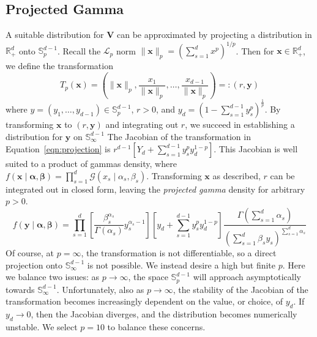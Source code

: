 \subsection{Projected Gamma\label{ref:pg}}
A suitable distribution for $\bm{V}$ can be approximated by projecting a 
    distribution in $\mathbb{R}_+^d$ onto $\mathbb{S}_{p}^{d-1}$.  
    Recall the $\mathcal{L}_p$ norm 
    $\lVert \bm{x}\rVert_p = \left(\sum_{s = 1}^dx^p\right)^{1/p}$.  Then
    for $\bm{x}\in\mathbb{R}_+^d$, we define the transformation
    \begin{equation}
        \label{eqn:projection}
        T_p(\bm{x}) = \left(\lVert \bm{x}\rVert_p, 
            \frac{x_1}{\lVert \bm{x}\rVert_p},\ldots, 
                \frac{x_{d-1}}{\lVert \bm{x}\rVert_p}\right)
                =: (r,\bm{y})
    \end{equation}
    where $y = (y_1,\ldots,y_{d-1}) \in \mathbb{S}_{p}^{d-1}$, $r > 0$, and 
    $y_d = (1 - \sum_{s = 1}^{d-1}y_{s}^p)^{\frac{1}{p}}$.
    By transforming $\bm{x}$ to $(r,\bm{y})$ and integrating out $r$, we
    succeed in establishing a distribution for $\bm{y}$ on 
    $\mathbb{S}_{\infty}^{d-1}$
    The Jacobian of the transformation in Equation~\eqref{eqn:projection} is
    $r^{d-1}[Y_d + \sum_{s = 1}^{d-1}y_{s}^py_d^{1-p}]$.
    This Jacobian is well suited to a product of gammas density, where 
    $f(\bm{x}\mid\bm{\alpha},\bm{\beta}) = 
        \prod_{s = 1}^d\mathcal{G}(x_{s}\mid\alpha_{s},\beta_{s})$.
    Transforming $\bm{x}$ as described, $r$ can be integrated out in closed
    form, leaving the \emph{projected gamma} density for arbitrary $p > 0$.
    \[
        f(\bm{y}\mid\bm{\alpha},\bm{\beta}) = \prod_{s = 1}^d\left[
            \frac{\beta_{s}^{\alpha_{s}}}{\Gamma(\alpha_{s})}
            y_{s}^{\alpha_{s} - 1}\right]
            \left[y_d + \sum_{s = 1}^{d-1}y_{s}^py_d^{1-p}\right]
            \frac{\Gamma(\sum_{s = 1}^d \alpha_{s})}{\left(
                \sum_{s = 1}^d\beta_{s}y_{s}
                \right)^{\sum_{s = 1}^d \alpha_{s}}
            }
    \]
    Of course, at $p=\infty$, the transformation is not differentiable, so a 
    direct projection onto $\mathbb{S}_{\infty}^{d-1}$ is not possible. We
    instead desire a high but finite $p$.
    Here we balance two issues: as $p\to\infty$, the space $\mathbb{S}_{p}^{d-1}$ 
    will approach asymptotically towards $\mathbb{S}_{\infty}^{d-1}$.
    Unfortunately, also as $p\to\infty$, the stability of the Jacobian of the
    transformation becomes increasingly dependent on the value, or choice, of 
    $y_d$.  If $y_d\to 0$, then the Jacobian diverges, and the distribution 
    becomes numerically unstable. We select $p = 10$ to balance these concerns.

